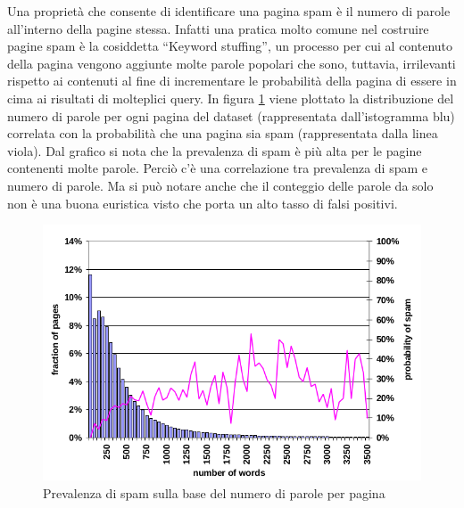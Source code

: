 Una proprietà che consente di identificare una pagina spam è il numero di parole all'interno della pagine stessa. Infatti una pratica molto comune nel costruire pagine spam è la cosiddetta ``Keyword stuffing'', un processo per cui al contenuto della pagina vengono aggiunte molte parole popolari che sono, tuttavia, irrilevanti  rispetto ai contenuti al fine di incrementare le probabilità della pagina di essere in cima ai risultati di molteplici query. In figura \ref{fig:fetterly3} viene plottato la distribuzione del numero di parole per ogni pagina del dataset (rappresentata dall'istogramma blu) correlata con la probabilità che una pagina sia spam (rappresentata dalla linea viola). Dal grafico si nota che la prevalenza di spam è più alta per le pagine contenenti molte parole. Perciò c'è una correlazione tra prevalenza di spam e numero di parole. Ma si può notare anche che il conteggio delle parole da solo non è una buona euristica visto che porta un alto tasso di falsi positivi.
\begin{figure}[htbp]
\centering
\includegraphics[width=12cm]{immagini/fetterly/fetterly3}
\caption{Prevalenza di spam sulla base del numero di parole per pagina}
\label{fig:fetterly3}
\end{figure}

